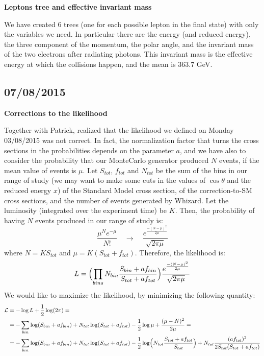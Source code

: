 \textbf{Leptons tree and effective invariant mass}

We have created 6 trees (one for each possible lepton in the final state) with only the variables we need. In particular there are the energy (and reduced energy), the three component of the momentum, the polar angle, and the invariant mass of the two electrons after radiating photons. This invariant mass is the effective energy at which the collisions happen, and the mean is 363.7 GeV. 

\subsection{07/08/2015}

\textbf{Corrections to the likelihood}

Together with Patrick, realized that the likelihood we defined on Monday 03/08/2015 was not correct. In fact, the normalization factor that turns the cross sections in the probabilities depends on the parameter $a$, and we have also to consider the probability that our MonteCarlo generator produced $N$ events, if the mean value of events is $\mu$.
Let $S_{tot}$, $f_{tot}$ and $N_{tot}$ be the sum of the bins in our range of study (we may want to make some cuts in the values of $\cos\theta$ and the reduced energy $x$) of the Standard Model cross section, of the correction-to-SM cross sections, and the number of events generated by Whizard. Let the luminosity (integrated over the experiment time) be $K$. Then, the probability of having $N$ events produced in our range of study is:
\[
\frac{\mu^Ne^{-\mu}}{N!} \quad\rightarrow\quad \frac{e^{\frac{-(N-\mu)^2}{2\mu}}}{\sqrt{2\pi\mu}}
\]
where $N=KS_{tot}$ and $\mu = K(S_{tot}+f_{tot})$.
Therefore, the likelihood is:
\[
L = \Bigl(\prod_{bins}N_{bin}\frac{S_{bin}+af_{bin}}{S_{tot}+af_{tot}}\Bigr)\frac{e^{\frac{-(N-\mu)^2}{2\mu}}}{\sqrt{2\pi\mu}}
\]
We would like to maximize the likelihood, by minimizing the following quantity:
\begin{equation}
\begin{split}
\mathcal{L} &= -\log{L} +\frac{1}{2}\log(2\pi) =\\
&=- \sum_{bin}\log(S_{bin}+af_{bin})+N_{tot}\log(S_{tot}+af_{tot})-\frac{1}{2}\log\mu+\frac{(\mu-N)^2}{2\mu} =\\
&=- \sum_{bin}\log(S_{bin}+af_{bin})+N_{tot}\log(S_{tot}+af_{tot})-\frac{1}{2}\log\Bigl(N_{tot}\frac{S_{tot}+af_{tot}}{S_{tot}}\Bigr)+N_{tot}\frac{(af_{tot})^2}{2S_{tot}(S_{tot}+af_{tot})}
\end{split}
\end{equation}